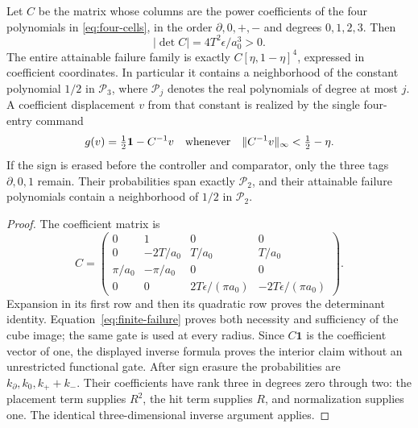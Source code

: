 \begin{theorem}\label{thm:calibrated-rank}
Let $C$ be the matrix whose columns are the power coefficients of the four
polynomials in \eqref{eq:four-cells}, in the order
$\partial,0,+,-$ and degrees $0,1,2,3$. Then
\[
 |\det C|=4T^2\epsilon/a_0^3>0.
\]
The entire attainable failure family is exactly
$C[\eta,1-\eta]^4$, expressed in coefficient coordinates. In particular it
contains a neighborhood of the constant polynomial $1/2$ in $\mathcal P_3$,
where $\mathcal P_j$ denotes the real polynomials of degree at most $j$.
A coefficient displacement $v$ from that constant is realized by the single
four-entry command
\[
 g(v)=\tfrac12\mathbf 1-C^{-1}v
 \quad\hbox{whenever}\quad
 \|C^{-1}v\|_\infty<\tfrac12-\eta.
\]
If the sign is erased before the controller and comparator, only the three
tags $\partial,0,1$ remain. Their probabilities span exactly $\mathcal P_2$,
and their attainable failure polynomials contain a neighborhood of $1/2$
in $\mathcal P_2$.
\end{theorem}
\begin{proof}
The coefficient matrix is
\[
 C=\begin{pmatrix}
 0&1&0&0\\
 0&-2T/a_0&T/a_0&T/a_0\\
 \pi/a_0&-\pi/a_0&0&0\\
 0&0&2T\epsilon/(\pi a_0)&-2T\epsilon/(\pi a_0)
 \end{pmatrix}.
\]
Expansion in its first row and then its quadratic row proves the determinant
identity. Equation~\eqref{eq:finite-failure} proves both necessity and
sufficiency of the cube image; the same gate is used at every radius.
Since $C\mathbf1$ is the coefficient vector of one, the displayed inverse
formula proves the interior claim without an unrestricted functional gate.
After sign erasure the probabilities are $k_\partial,k_0,k_++k_-$.
Their coefficients have rank three in degrees zero through two: the
placement term supplies $R^2$, the hit term supplies $R$, and normalization
supplies one. The identical three-dimensional inverse argument applies.
\end{proof}

